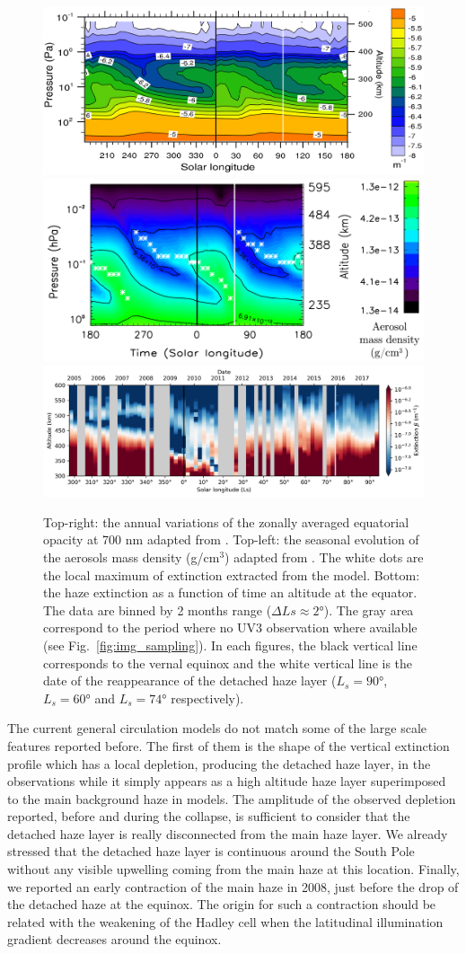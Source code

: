 \begin{figure}[!ht]
    \centering
    \includegraphics[width=.4\textwidth]{Fig/Lebonnois2012_dhl_cycle.png}
    \includegraphics[width=.4\textwidth]{Fig/Larson2015_dhl_cycle.png}
    \includegraphics[width=.8\textwidth]{Fig/DHL_time_eq.png}
    \caption{Top-right: the annual variations of the zonally averaged equatorial opacity at 700 nm adapted
        from \cite{Lebonnois2012}.
        Top-left: the seasonal evolution of the aerosols mass density (g/cm$^3$) adapted from \cite{Larson2015}. The white dots are the local maximum of extinction extracted from the model.
        Bottom: the haze extinction as a function of time an altitude at the equator. The data are binned
        by 2 months range ($\Delta Ls \approx \ang{2} $). The gray area correspond to the period where
        no UV3 observation where available (see Fig.~\ref{fig:img_sampling}).
        In each figures, the black vertical line corresponds to the vernal equinox and the white vertical
        line is the date of the reappearance of the detached haze layer ($L_s = \ang{90}$, $L_s = \ang{60}$
        and $L_s = \ang{74}$ respectively).
    }
    \label{fig:gcm_cycle}
\end{figure}

The current general circulation models do not match some of the large scale features reported before. The first of them
is the shape of the vertical extinction profile which has a local depletion, producing the detached haze layer, in the
observations while it simply appears as a high altitude haze layer superimposed to the main background haze in models.
The amplitude of the observed depletion reported, before and during the collapse, is sufficient to consider that the
detached haze layer is really disconnected from the main haze layer. We already stressed that the detached haze layer is
continuous around the South Pole without any visible upwelling coming from the main haze at this location. Finally, we
reported an early contraction of the main haze in 2008, just before the drop of the detached haze at the equinox. The origin
for such a contraction should be related with the weakening of the Hadley cell when the latitudinal illumination gradient
decreases around the equinox.

